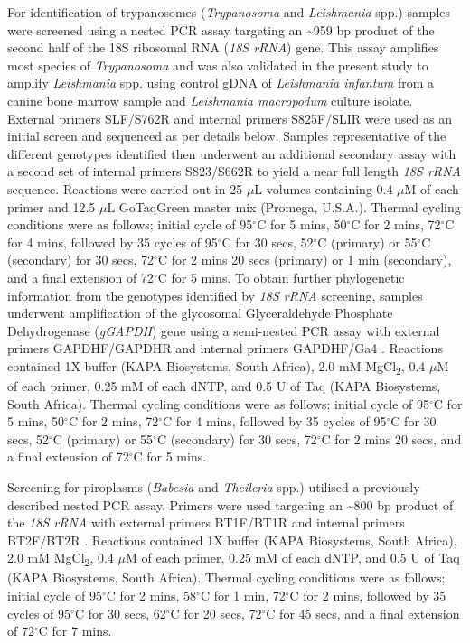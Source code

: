\documentclass[a4paper, nobind]{templates/ociamthesis}
\begin{document}
For identification of trypanosomes (\emph{Trypanosoma} and \emph{Leishmania} spp.) samples were screened using a nested PCR assay targeting an \textasciitilde959 bp product of the second half of the 18S ribosomal RNA (\emph{18S rRNA}) gene. This assay amplifies most species of \emph{Trypanosoma} \autocite{mcinnesTrypanosomaIrwiniSp2009} and was also validated in the present study to amplify \emph{Leishmania} spp. using control gDNA of \emph{Leishmania infantum} from a canine bone marrow sample and \emph{Leishmania macropodum} culture isolate. External primers SLF/S762R and internal primers S825F/SLIR were used as an initial screen and sequenced as per details below. Samples representative of the different genotypes identified then underwent an additional secondary assay with a second set of internal primers S823/S662R to yield a near full length \emph{18S rRNA} sequence. Reactions were carried out in 25 \(\mu\)L volumes containing 0.4 \(\mu\)M of each primer and 12.5 \(\mu\)L GoTaq\textregistered Green master mix (Promega, U.S.A.). Thermal cycling conditions were as follows; initial cycle of 95\(^\circ\)C for 5 mins, 50\(^\circ\)C for 2 mins, 72\(^\circ\)C for 4 mins, followed by 35 cycles of 95\(^\circ\)C for 30 secs, 52\(^\circ\)C (primary) or 55\(^\circ\)C (secondary) for 30 secs, 72\(^\circ\)C for 2 mins 20 secs (primary) or 1 min (secondary), and a final extension of 72\(^\circ\)C for 5 mins. To obtain further phylogenetic information from the genotypes identified by \emph{18S rRNA} screening, samples underwent amplification of the glycosomal Glyceraldehyde Phosphate Dehydrogenase (\emph{gGAPDH}) gene using a semi-nested PCR assay with external primers GAPDHF/GAPDHR and internal primers GAPDHF/Ga4 \autocite{mcinnesTrypanosomaIrwiniSp2009}. Reactions contained 1X buffer (KAPA Biosystems, South Africa), 2.0 mM MgCl\textsubscript{2}, 0.4 \(\mu\)M of each primer, 0.25 mM of each dNTP, and 0.5 U of Taq (KAPA Biosystems, South Africa). Thermal cycling conditions were as follows; initial cycle of 95\(^\circ\)C for 5 mins, 50\(^\circ\)C for 2 mins, 72\(^\circ\)C for 4 mins, followed by 35 cycles of 95\(^\circ\)C for 30 secs, 52\(^\circ\)C (primary) or 55\(^\circ\)C (secondary) for 30 secs, 72\(^\circ\)C for 2 mins 20 secs, and a final extension of 72\(^\circ\)C for 5 mins.

Screening for piroplasms (\emph{Babesia} and \emph{Theileria} spp.) utilised a previously described nested PCR assay. Primers were used targeting an \textasciitilde800 bp product of the \emph{18S rRNA} with external primers BT1F/BT1R and internal primers BT2F/BT2R \autocite{jefferiesPCRRFLPDetectionDifferentiation2007}. Reactions contained 1X buffer (KAPA Biosystems, South Africa), 2.0 mM MgCl\textsubscript{2}, 0.4 \(\mu\)M of each primer, 0.25 mM of each dNTP, and 0.5 U of Taq (KAPA Biosystems, South Africa). Thermal cycling conditions were as follows; initial cycle of 95\(^\circ\)C for 2 mins, 58\(^\circ\)C for 1 min, 72\(^\circ\)C for 2 mins, followed by 35 cycles of 95\(^\circ\)C for 30 secs, 62\(^\circ\)C for 20 secs, 72\(^\circ\)C for 45 secs, and a final extension of 72\(^\circ\)C for 7 mins.
\end{document}
